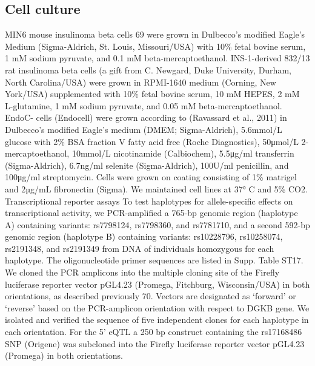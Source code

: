 \subsection{Cell culture}
MIN6 mouse insulinoma beta cells 69 were grown in Dulbecco’s modified Eagle’s Medium (Sigma-Aldrich, St. Louis, Missouri/USA) with 10\% fetal bovine serum, 1 mM sodium pyruvate, and 0.1 mM beta-mercaptoethanol. INS-1-derived 832/13 rat insulinoma beta cells (a gift from C. Newgard, Duke University, Durham, North Carolina/USA) were grown in RPMI-1640 medium (Corning, New York/USA) supplemented with 10\% fetal bovine serum, 10 mM HEPES, 2 mM L-glutamine, 1 mM sodium pyruvate, and 0.05 mM beta-mercaptoethanol. EndoC- cells (Endocell) were grown according to (Ravassard et al., 2011) in Dulbecco’s modified Eagle’s medium (DMEM; Sigma-Aldrich), 5.6mmol/L glucose with 2\% BSA fraction V fatty acid free (Roche Diagnostics), 50μmol/L 2-mercaptoethanol, 10mmol/L nicotinamide (Calbiochem), 5.5μg/ml transferrin (Sigma-Aldrich), 6.7ng/ml selenite (Sigma-Aldrich), 100U/ml penicillin, and 100μg/ml streptomycin. Cells were grown on coating consisting of 1\% matrigel and 2µg/mL fibronectin (Sigma). We maintained cell lines at 37° C and 5\% CO2.
Transcriptional reporter assays
To test haplotypes for allele-specific effects on transcriptional activity, we PCR-amplified a 765-bp genomic region (haplotype A) containing variants: rs7798124, rs7798360, and rs7781710, and a second 592-bp genomic region (haplotype B) containing variants: rs10228796, rs10258074, rs2191348, and rs2191349 from DNA of individuals homozygous for each haplotype. The oligonucleotide primer sequences are listed in Supp. Table ST17. We cloned the PCR amplicons into the multiple cloning site of the Firefly luciferase reporter vector pGL4.23 (Promega, Fitchburg, Wisconsin/USA) in both orientations, as described previously 70. Vectors are designated as ‘forward’ or ‘reverse’ based on the PCR-amplicon orientation with respect to DGKB gene. We isolated and verified the sequence of five independent clones for each haplotype in each orientation. For the 5’ eQTL a 250 bp construct containing the rs17168486 SNP (Origene) was subcloned into the Firefly luciferase reporter vector pGL4.23 (Promega) in both orientations.
